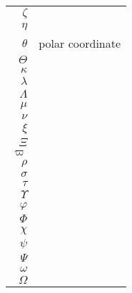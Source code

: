 \begin{multicols}{2}
\begin{tabular}{|r|l|}
        $\zeta$& \\
        $\eta$ & \\
        $\theta$ & polar coordinate\\
        $\Theta$  & \\
        $\kappa$& \\
        $\lambda$& \\
        $\Lambda$& \\
        $\mu$& \\
        $\nu$& \\
        $\xi$& \\
        $\Xi$& \\
        $\varpi$& \\
        $\rho$& \\
        $\sigma$& \\
        $\tau$& \\
        $\Upsilon$& \\
        $\varphi$& \\
        $\Phi$& \\
        $\chi$& \\
        $\psi$& \\
        $\Psi$& \\
        $\omega$& \\
        $\Omega$& \\
    \hline
\end{tabular}
\end{multicols}
